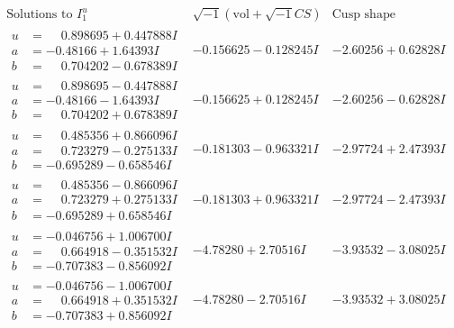 \documentclass[1p]{elsarticle_modified}
\theoremstyle{definition}
\newcommand{\I}{\sqrt{-1}}
\begin{document}
$$\begin{array}{c|c|c}  
\text{Solutions to }I^u_{1}& \I (\text{vol} + \sqrt{-1}CS) & \text{Cusp shape}\\
 \hline 
\begin{aligned}
u &= \phantom{-}0.898695 + 0.447888 I \\
a &= -0.48166 + 1.64393 I \\
b &= \phantom{-}0.704202 - 0.678389 I\end{aligned}
 & -0.156625 - 0.128245 I & -2.60256 + 0.62828 I \\ \hline\begin{aligned}
u &= \phantom{-}0.898695 - 0.447888 I \\
a &= -0.48166 - 1.64393 I \\
b &= \phantom{-}0.704202 + 0.678389 I\end{aligned}
 & -0.156625 + 0.128245 I & -2.60256 - 0.62828 I \\ \hline\begin{aligned}
u &= \phantom{-}0.485356 + 0.866096 I \\
a &= \phantom{-}0.723279 - 0.275133 I \\
b &= -0.695289 - 0.658546 I\end{aligned}
 & -0.181303 - 0.963321 I & -2.97724 + 2.47393 I \\ \hline\begin{aligned}
u &= \phantom{-}0.485356 - 0.866096 I \\
a &= \phantom{-}0.723279 + 0.275133 I \\
b &= -0.695289 + 0.658546 I\end{aligned}
 & -0.181303 + 0.963321 I & -2.97724 - 2.47393 I \\ \hline\begin{aligned}
u &= -0.046756 + 1.006700 I \\
a &= \phantom{-}0.664918 - 0.351532 I \\
b &= -0.707383 - 0.856092 I\end{aligned}
 & -4.78280 + 2.70516 I & -3.93532 - 3.08025 I \\ \hline\begin{aligned}
u &= -0.046756 - 1.006700 I \\
a &= \phantom{-}0.664918 + 0.351532 I \\
b &= -0.707383 + 0.856092 I\end{aligned}
 & -4.78280 - 2.70516 I & -3.93532 + 3.08025 I \\ \hline\begin{aligned}

\end{aligned}
\end{array}$$
\end{document}

